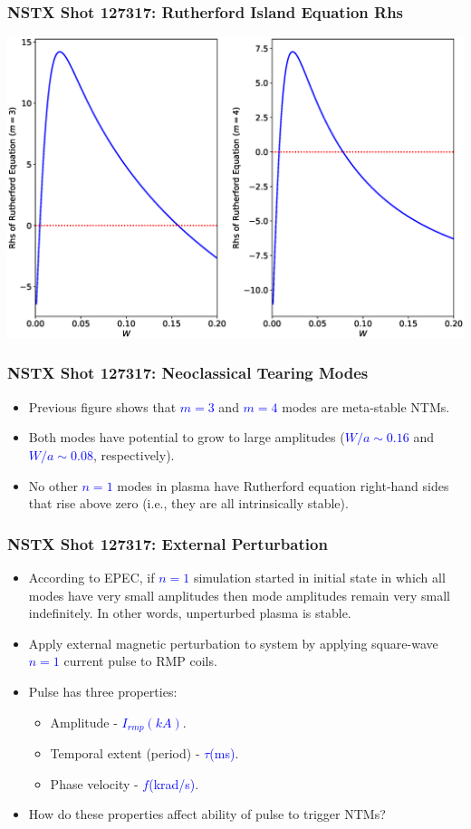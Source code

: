 \documentclass{beamer}
\newcommand{\blue}[1]{\textcolor{blue}{#1}}
\begin{document}
\begin{frame}
\frametitle{NSTX Shot 127317: Rutherford Island Equation Rhs}

\begin{center}
\includegraphics[width=\textwidth]{Rhs.eps}
\end{center}
\end{frame}

\begin{frame}
\frametitle{NSTX Shot 127317: Neoclassical Tearing Modes}

\begin{itemize}
\item Previous figure shows that \blue{$m=3$} and \blue{$m=4$} modes are meta-stable NTMs.
\item Both modes have potential to grow to large amplitudes (\blue{$W/a\sim 0.16$} and \blue{$W/a\sim 0.08$},
respectively). 
\item No other \blue{$n=1$} modes in plasma have Rutherford equation right-hand sides that rise above zero (i.e.,
they are all intrinsically stable).
\end{itemize}
\end{frame}

\begin{frame}
\frametitle{NSTX Shot 127317: External Perturbation}
\begin{itemize}
\item According to EPEC, if \blue{$n=1$} simulation started in initial state in which all modes have very small
amplitudes then mode amplitudes remain very small indefinitely. In other words, unperturbed plasma is
stable.
\item Apply external magnetic perturbation to system by applying square-wave \blue{$n=1$} current pulse to RMP coils. 
\item Pulse has three properties:
\begin{itemize}
\item Amplitude - \blue{$I_{rmp}(kA)$}.
\item Temporal extent (period)  - \blue{$\tau$(ms)}.
\item Phase velocity - \blue{$f$(krad/s)}.
\end{itemize}
\item How do these properties affect ability of pulse to trigger NTMs?
\end{itemize}

\end{frame}
\end{document}
